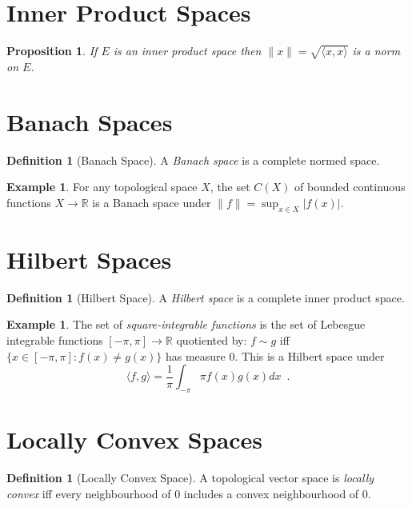 \documentclass{book}
\newtheorem{prop}[ax]{Proposition}
\theoremstyle{definition}
\newtheorem{df}[ax]{Definition}
\newtheorem{ex}[ax]{Example}
\begin{document}
\section{Inner Product Spaces}

\begin{prop}
If $E$ is an inner product space then $\| x \| = \sqrt{\langle x,x \rangle}$ is a norm on $E$.
\end{prop}

\section{Banach Spaces}

\begin{df}[Banach Space]
A \emph{Banach space} is a complete normed space.
\end{df}

\begin{ex}
For any topological space $X$, the set $C(X)$ of bounded continuous functions $X \rightarrow \mathbb{R}$ is a Banach space under $\| f \| = \sup_{x \in X} |f(x)|$.
\end{ex}

\section{Hilbert Spaces}

\begin{df}[Hilbert Space]
A \emph{Hilbert space} is a complete inner product space.
\end{df}

\begin{ex}
The set of \emph{square-integrable functions} is the set of Lebesgue integrable functions $[-\pi,\pi] \rightarrow \mathbb{R}$ quotiented by: $f \sim g$ iff $\{ x \in [-\pi,\pi] : f(x) \neq g(x) \}$ has measure 0. This is a Hilbert space under
\[ \langle f,g \rangle = \frac{1}{\pi} \int_{- \pi}{\pi} f(x) g(x) dx \enspace . \]
\end{ex}

\section{Locally Convex Spaces}

\begin{df}[Locally Convex Space]
A topological vector space is \emph{locally convex} iff every neighbourhood of 0 includes a convex neighbourhood of 0.
\end{df}
\end{document}
